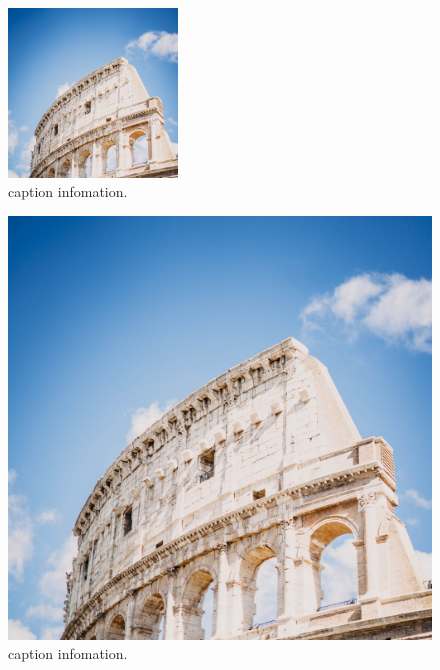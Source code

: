 \begin{figure}[!htbp]
    \begin{mdframed}
        \centering
        \includegraphics[width=0.4\textwidth]{./assets/img/background/colosseum_architecture_building_147889_2780x2780.jpg}
        \caption{caption infomation.}
        \label{fig:example1}
    \end{mdframed}
\end{figure}
%
\begin{figure}[!htbp]
    \centering
    \begin{mdframed}[userdefinedwidth=0.4\textwidth,align=center]
        \centering
        \includegraphics[width=1.0\textwidth]{./assets/img/background/colosseum_architecture_building_147889_2780x2780.jpg}
    \end{mdframed}
    \caption{caption infomation.}
    \label{fig:example3}
\end{figure}
